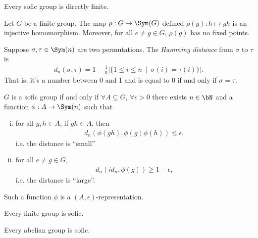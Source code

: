 \begin{thm}\label{thm:sofic-groups-DF}
	Every sofic group is directly finite.
\end{thm}

\begin{prop}\label{prop:finite-group-injects-into-Sym}
	Let $G$ be a finite group. The map  $\rho:G\to \Sym(G)$ defined $\rho(g):h\mapsto gh$ is an injective homomorphism. Moreover, for all $e \neq g \in G$, $\rho(g)$ has no fixed points.
\end{prop}

\begin{defn}\label{defn:hamming-dist}
	Suppose $\sigma, \tau \in \Sym(n)$ are two permutations. The \emph{Hamming distance} from $
\sigma$ to $\tau$ is
\begin{align*}
	d_n(\sigma, \tau) = 1 - \frac{1}{n}\left|\{1 \leq i \leq n ~ \mid ~ \sigma(i) = \tau(i)\}\right|.
\end{align*}
That is, it's a number between 0 and 1 and is equal to 0 if and only if $\sigma = \tau$.
\end{defn}

\begin{defn}[Sofic]\label{defn:sofic-group}
	$G$ is a sofic group if and only if $\forall A \subseteq G$, $\forall \epsilon > 0 $ there exists $n \in \bN$ and a function $\phi:A\to \Sym(n)$ such that
	\begin{enumerate}[(i)]
		\item for all $g, h \in A$, if $gh \in A$, then 
			\begin{align*}
				d_n(\phi(gh),\phi(g)\phi(h)) \leq \epsilon,
			\end{align*}
		i.e. the distance is ``small''
	\item for all $e \neq g \in G$,
		\begin{align*}
			d_n(id_n, \phi(g)) \geq 1 - \epsilon,
		\end{align*}
		i.e. the distance is ``large''.
	\end{enumerate}
	Such a function $\phi$ is a $(A, \epsilon)$-representation.
\end{defn}

\begin{example}\label{ex:finite-group-sofic}
	Every finite group is sofic.
\end{example}

\begin{thm}\label{thm:abelian-groups-sofic}
	Every abelian group is sofic.
\end{thm}


